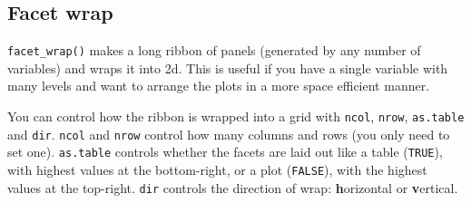 \begin{Shaded}
\end{Shaded}

\subsection{Facet wrap}\label{sub:facet-wrap}

\texttt{facet\_wrap()} makes a long ribbon of panels (generated by any
number of variables) and wraps it into 2d. This is useful if you have a
single variable with many levels and want to arrange the plots in a more
space efficient manner.  
\indexc{\textasciitilde}

You can control how the ribbon is wrapped into a grid with
\texttt{ncol}, \texttt{nrow}, \texttt{as.table} and \texttt{dir}.
\texttt{ncol} and \texttt{nrow} control how many columns and rows (you
only need to set one). \texttt{as.table} controls whether the facets are
laid out like a table (\texttt{TRUE}), with highest values at the
bottom-right, or a plot (\texttt{FALSE}), with the highest values at the
top-right. \texttt{dir} controls the direction of wrap:
\textbf{h}orizontal or \textbf{v}ertical.

\begin{Shaded}
\begin{Highlighting}[]
\StringTok{ }\StringTok{ }
\StringTok{  }\NormalTok{() +}\StringTok{ }
\StringTok{  }\NormalTok{(}\NormalTok{) +}\StringTok{ }
\StringTok{  }\NormalTok{(}\NormalTok{)}

\StringTok{ } \NormalTok{)}
\StringTok{ } \NormalTok{, } \NormalTok{)}
\end{Highlighting}
\end{Shaded}

